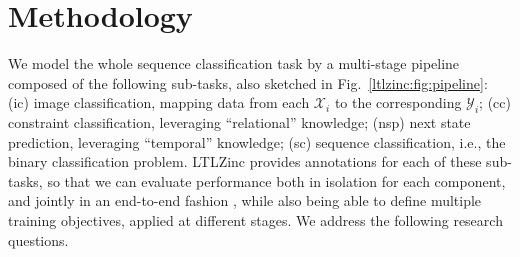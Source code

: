 	

	
\iffalse	
	\section{Methodology}
	\label{ijcai:sec:setup}
	
	We model the whole sequence classification task by %
	a multi-stage pipeline composed of the following sub-tasks, also sketched in Fig.~\ref{ltlzinc:fig:pipeline}: ({\sc\small ic}) image classification, mapping data from each $\mathcal{X}_i$ to the corresponding $\mathcal{Y}_i$; ({\sc\small cc}) constraint classification, leveraging ``relational'' knowledge; ({\sc\small nsp}) next state prediction, leveraging ``temporal'' knowledge; ({\sc\small sc}) sequence classification, i.e., the binary classification problem.
	LTLZinc provides annotations for each of these sub-tasks, so that we can evaluate performance both in isolation for each component, and jointly in an end-to-end fashion%
	, while also being able to define multiple training objectives, applied at different stages.
	We %
	address the following research questions.
	
	\noindent{}
	
